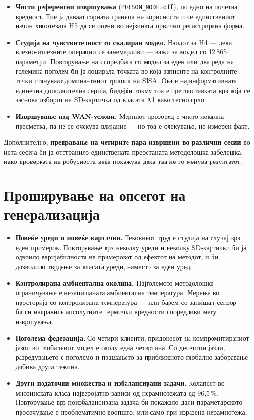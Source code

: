 \begin{itemize}
  \item \textbf{Чисти референтни извршувања} (\texttt{POISON\_MODE=off}), по едно на почетна
  вредност. Тие ја даваат горната граница на корисноста и се единствениот начин хипотезата H5
  да се оцени во нејзината првично регистрирана форма.
  \item \textbf{Студија на чувствителност со скалиран модел.} Наодот за H4 --- дека
  влезно-излезните операции се занемарливи --- важи за модел со 12\,865 параметри.
  Повторување на споредбата со модел за еден или два реда на големина поголем би ја лоцирала
  точката во која записите на контролните точки стануваат доминантниот трошок на SISA. Ова е
  најинформативната единечна дополнителна серија, бидејќи токму тоа е претпоставката врз која
  се заснова изборот на SD-картичка од класата A1 како тесно грло.
  \item \textbf{Извршување под WAN-услови.} Мерниот прозорец е чисто локална пресметка, па не се
  очекува влијание --- но тоа е очекување, не измерен факт.
\end{itemize}

Дополнително, \textbf{преправање на четирите пара извршени во различни сесии} во иста сесија би ја
отстранило единствената преостаната методолошка забелешка, иако проверката на робусноста веќе
покажува дека таа не го менува резултатот.

\section{Проширување на опсегот на генерализација}

\begin{itemize}
  \item \textbf{Повеќе уреди и повеќе картички.} Тековниот труд е студија на случај врз еден
  примерок. Повторување врз неколку уреди и неколку SD-картички би ја одвоило варијабилноста
  на примерокот од ефектот на методот, и би дозволило тврдење за класата уреди, наместо за
  еден уред.
  \item \textbf{Контролирана амбиентална околина.} Најголемото методолошко ограничување е
  незапишаната амбиентална температура. Мерења во просторија со контролирана температура ---
  или барем со запишан сензор --- би ги направиле апсолутните термички вредности споредливи
  меѓу извршувања.
  \item \textbf{Поголема федерација.} Со четири клиенти, придонесот на компромитираниот јазол во
  глобалниот модел е околу една четвртина. Со десетици јазли, разредувањето е поголемо и
  прашањето за приближното глобално заборавање добива друга тежина.
  \item \textbf{Други податочни множества и избалансирани задачи.} Колапсот во мнозинската класа
  најверојатно зависи од нерамнотежата од 96,5\,\%. Повторување врз поизбалансирана задача би
  покажало дали параметарското просечување е проблематично воопшто, или само при изразена
  нерамнотежа.
\end{itemize}


